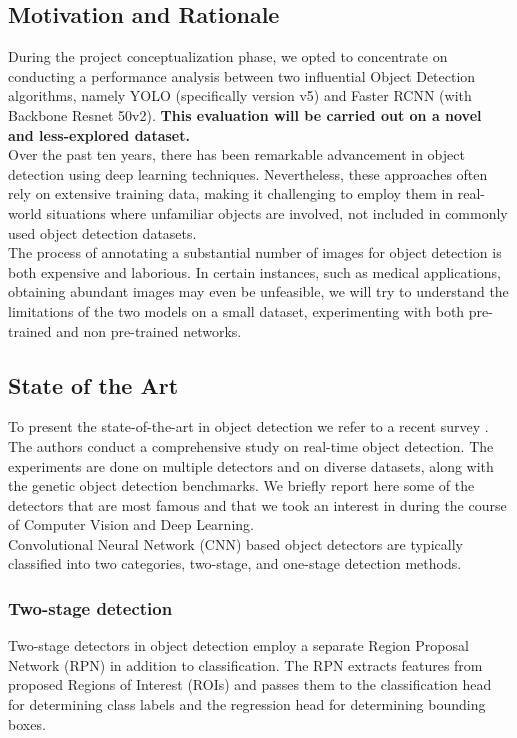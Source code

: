 \subsection{Motivation and Rationale}
During the project conceptualization phase, we opted to concentrate on conducting a performance analysis between two influential Object Detection algorithms, namely YOLO (specifically version v5) and Faster RCNN (with Backbone Resnet 50v2). \textbf{This evaluation will be carried out on a novel and less-explored dataset.}\\
Over the past ten years, there has been remarkable advancement in object detection using deep learning techniques.\cite{kohleretal}
Nevertheless, these approaches often rely on extensive training data, making it challenging to employ them in real-world situations where unfamiliar objects are involved, not included in commonly used object detection datasets.\\ The process of annotating a substantial number of images for object detection is both expensive and laborious. In certain instances, such as medical applications, obtaining abundant images may even be unfeasible, we will try to understand the limitations of the two models on a small dataset, experimenting with both pre-trained and non pre-trained networks.

\subsection{State of the Art}
To present the state-of-the-art in object detection we refer to a recent survey \cite{aranietal}. The authors conduct a comprehensive study on real-time object detection. The experiments are done on multiple detectors and on diverse datasets, along with the genetic object detection benchmarks. We briefly report here some of the detectors that are most famous and that we took an interest in during the course of Computer Vision and Deep Learning.\\

Convolutional Neural Network (CNN) based object detectors are typically
classified into two categories, two-stage, and one-stage detection methods.

\subsubsection{Two-stage detection}
Two-stage detectors in object detection employ a separate Region Proposal Network (RPN) in addition to classification. The RPN extracts features from proposed Regions of Interest (ROIs) and passes them to the classification head for determining class labels and the regression head for determining bounding boxes.\cite{aranietal}

